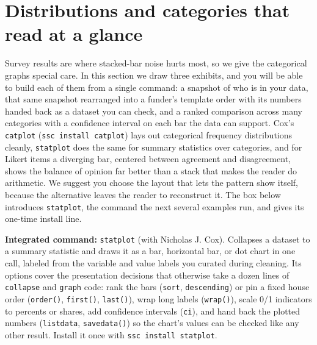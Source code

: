 \documentclass[
    a4paper,
    fontsize=10pt,
    twoside=true,
    numbers=noenddot,
]{kaobook}
\begin{document}
\section{Distributions and categories that read at a glance}
Survey results are where stacked-bar noise hurts most, so we give the categorical graphs special care. In this section we draw three exhibits, and you will be able to build each of them from a single command: a snapshot of who is in your data, that same snapshot rearranged into a funder's template order with its numbers handed back as a dataset you can check, and a ranked comparison across many categories with a confidence interval on each bar the data can support. Cox's \texttt{catplot} (\texttt{ssc install catplot}) lays out categorical frequency distributions cleanly, \texttt{statplot} does the same for summary statistics over categories, and for Likert items a diverging bar, centered between agreement and disagreement, shows the balance of opinion far better than a stack that makes the reader do arithmetic. We suggest you choose the layout that lets the pattern show itself, because the alternative leaves the reader to reconstruct it. The box below introduces \texttt{statplot}, the command the next several examples run, and gives its one-time install line.

\begin{kaobox}[frametitle=Package Integration: \texttt{statplot}]
\textbf{Integrated command:} \texttt{statplot} (with Nicholas J. Cox). Collapses a dataset to a summary statistic and draws it as a bar, horizontal bar, or dot chart in one call, labeled from the variable and value labels you curated during cleaning. Its options cover the presentation decisions that otherwise take a dozen lines of \texttt{collapse} and \texttt{graph} code: rank the bars (\texttt{sort}, \texttt{descending}) or pin a fixed house order (\texttt{order()}, \texttt{first()}, \texttt{last()}), wrap long labels (\texttt{wrap()}), scale 0/1 indicators to percents or shares, add confidence intervals (\texttt{ci}), and hand back the plotted numbers (\texttt{listdata}, \texttt{savedata()}) so the chart's values can be checked like any other result. Install it once with \texttt{ssc install statplot}.
\end{kaobox}
\end{document}
